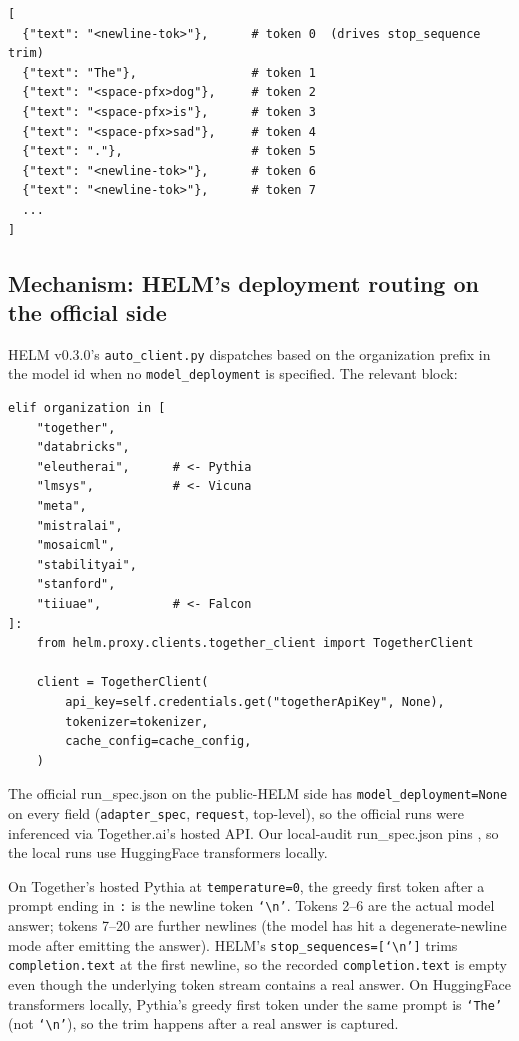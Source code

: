\documentclass[11pt]{article}
\begin{document}
\begin{lstlisting}[style=shell, caption={First eight tokens of the
  official Pythia-6.9B SR-Natural \texttt{completion}.\label{lst:tr-helm-tokens}}]
[
  {"text": "<newline-tok>"},      # token 0  (drives stop_sequence trim)
  {"text": "The"},                # token 1
  {"text": "<space-pfx>dog"},     # token 2
  {"text": "<space-pfx>is"},      # token 3
  {"text": "<space-pfx>sad"},     # token 4
  {"text": "."},                  # token 5
  {"text": "<newline-tok>"},      # token 6
  {"text": "<newline-tok>"},      # token 7
  ...
]
\end{lstlisting}

\subsection{Mechanism: HELM's deployment routing on the official side}
\label{sec:tr-case-b-mechanism}

HELM v0.3.0's \texttt{auto\_client.py} dispatches based on the
  organization prefix in the model id when no
  \texttt{model\_deployment} is specified.
The relevant block:

\begin{lstlisting}[style=python, caption={\path{helm/proxy/clients/auto_client.py:184--200}, v0.3.0.\label{lst:tr-helm-auto-client}}]
elif organization in [
    "together",
    "databricks",
    "eleutherai",      # <- Pythia
    "lmsys",           # <- Vicuna
    "meta",
    "mistralai",
    "mosaicml",
    "stabilityai",
    "stanford",
    "tiiuae",          # <- Falcon
]:
    from helm.proxy.clients.together_client import TogetherClient

    client = TogetherClient(
        api_key=self.credentials.get("togetherApiKey", None),
        tokenizer=tokenizer,
        cache_config=cache_config,
    )
\end{lstlisting}

The official run\_spec.json on the public-HELM side has
  \texttt{model\_deployment=None} on every field
  (\texttt{adapter\_spec}, \texttt{request}, top-level), so the
  official runs were inferenced via Together.ai's hosted API.
Our local-audit run\_spec.json pins
  , so the local
  runs use HuggingFace transformers locally.

On Together's hosted Pythia at \texttt{temperature=0}, the greedy
  first token after a prompt ending in \texttt{:} is the newline
  token \texttt{`\textbackslash n'}.
Tokens 2--6 are the actual model answer; tokens 7--20 are further
  newlines (the model has hit a degenerate-newline mode after
  emitting the answer).
HELM's \texttt{stop\_sequences=[`\textbackslash n']} trims
  \texttt{completion.text} at the first newline, so the recorded
  \texttt{completion.text} is empty even though the underlying token
  stream contains a real answer.
On HuggingFace transformers locally, Pythia's greedy first token
  under the same prompt is \texttt{`The'} (not
  \texttt{`\textbackslash n'}), so the trim happens after a real
  answer is captured.
\end{document}
